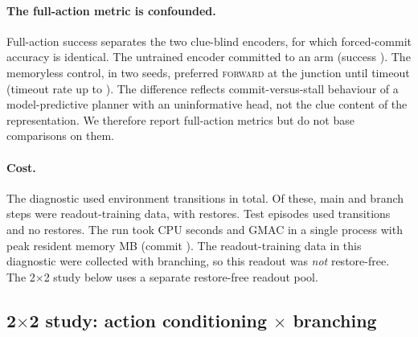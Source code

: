 \paragraph{The full-action metric is confounded.}
Full-action success separates the two clue-blind encoders, for which forced-commit accuracy is identical. The untrained encoder committed to an arm (success \DiagSuccessRandMax{}). The memoryless control, in two seeds, preferred \textsc{forward} at the junction until timeout (timeout rate up to \DiagTimeoutMemMax{}). The difference reflects commit-versus-stall behaviour of a model-predictive planner with an uninformative head, not the clue content of the representation. We therefore report full-action metrics but do not base comparisons on them.

\begin{table}[t]
\caption{Evaluator diagnostic (fixed encoders, symmetric maze). Entries are per seed (\DiagSeeds). Forced-commit is the primary junction-decision metric. Full-action success and timeout come from the unrestricted planner. ``Epochs'' is the head checkpoint selected on development reward error. Source: \texttt{runs/diag\_20260926T160006Z\_281020c}.}
\label{tab:diag}
\centering
\small
\resizebox{\linewidth}{!}{}
\end{table}

\paragraph{Cost.}
The diagnostic used \DiagTransitionsAll{} environment transitions in total. Of these, \DiagTransitionsTrainMain{} main and \DiagTransitionsTrainBranch{} branch steps were readout-training data, with \DiagTransitionsTrainRestores{} restores. Test episodes used \DiagTransitionsTest{} transitions and no restores. The run took \DiagCPUSeconds{} CPU seconds and \DiagTotalGMAC{} GMAC in a single process with peak resident memory \DiagPeakRSSMB{} MB (commit \texttt{\DiagCommit}). The readout-training data in this diagnostic were collected with branching, so this readout was \emph{not} restore-free. The 2$\times$2 study below uses a separate restore-free readout pool.

\subsection{\texorpdfstring{2$\times$2 study: action conditioning $\times$ branching}{2x2 study: action conditioning x branching}}
\label{sec:study}

